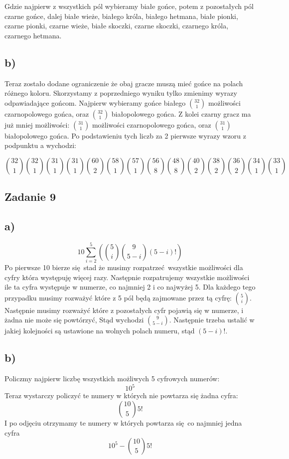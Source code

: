 \documentclass{article}
\begin{document}
Gdzie najpierw z wszystkich pól wybieramy białe gońce, potem z pozostałych pól czarne gońce, dalej białe wieże, białego króla, białego hetmana, białe pionki, czarne pionki, czarne wieże, białe skoczki, czarne skoczki, czarnego króla, czarnego hetmana.

\subsection*{b)}
Teraz zostało dodane ograniczenie że obaj gracze muszą mieć gońce na polach różnego koloru. Skorzystamy z poprzedniego wyniku tylko zmienimy wyrazy odpawiadające gońcom.
Najpierw wybieramy gońce białego ${32 \choose 1}$ możliwości czarnopolowego gońca, oraz
${32 \choose 1}$ białopolowego gońca. Z kolei czarny gracz ma już mniej możliwości:
${31 \choose 1}$ możliwości czarnopolowego gońca, oraz ${31 \choose 1}$  białopolowego gońca. Po podstawieniu tych liczb za 2 pierwsze wyrazy wzoru z podpunktu a wychodzi:

\[ {32 \choose 1}{32 \choose 1} {31 \choose 1} {31 \choose 1} {60 \choose 2} {58 \choose 1} {57 \choose 1} {56 \choose 8} {48 \choose 8} {40 \choose 2} {38 \choose 2} {36 \choose 2} {34 \choose 1} {33 \choose 1}\]

\subsection*{Zadanie 9}
\subsection*{a)}
\[ 10 \sum^5_{i=2} ({5 \choose i}  {9 \choose 5-i} (5-i)!)\]
Po pierwsze 10 bierze się stad że musimy rozpatrzeć wszystkie możliwości dla cyfry która występuję więcej razy. Następnie rozpatrujemy wszystkie możliwości ile ta cyfra występuje w numerze, co najmniej 2 i co najwyżej 5. Dla każdego tego przypadku musimy rozważyć które z 5 pól będą zajmowane przez tą cyfrę: $5 \choose i$. Następnie musimy rozważyć które z pozostałych cyfr pojawią się w numerze, i żadna nie może się powtórzyć, Stąd wychodzi ${9 \choose 5-i} $. Następnie trzeba ustalić w jakiej kolejności są ustawione na wolnych polach numeru, stąd $(5-i)!$.

\subsection*{b)}
Policzmy najpierw liczbę wszystkich możliwych 5 cyfrowych numerów: \[10^5\] Teraz wystarczy policzyć te numery w których nie powtarza się żadna cyfra:
\[{10 \choose 5} 5!\]
I po odjęciu otrzymamy te numery w których powtarza się co najmniej jedna cyfra
\[ 10^5 - {10 \choose 5} 5!\]
\end{document}
